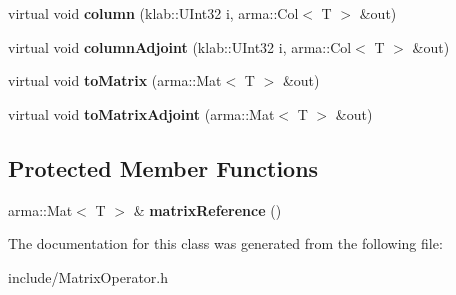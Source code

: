 \begin{DoxyCompactItemize}
\item 
virtual void {\bfseries column} (klab\+::\+U\+Int32 i, arma\+::\+Col$<$ T $>$ \&out)\hypertarget{classkl1p_1_1TMatrixOperator_aec50334a8ff1c438897a8f7abdf3b3b7}{}\label{classkl1p_1_1TMatrixOperator_aec50334a8ff1c438897a8f7abdf3b3b7}

\item 
virtual void {\bfseries column\+Adjoint} (klab\+::\+U\+Int32 i, arma\+::\+Col$<$ T $>$ \&out)\hypertarget{classkl1p_1_1TMatrixOperator_aea91e234240321e0bd04a9e97d3748b1}{}\label{classkl1p_1_1TMatrixOperator_aea91e234240321e0bd04a9e97d3748b1}

\item 
virtual void {\bfseries to\+Matrix} (arma\+::\+Mat$<$ T $>$ \&out)\hypertarget{classkl1p_1_1TMatrixOperator_af4b41d27d38c0388128e4f03f4c2edf1}{}\label{classkl1p_1_1TMatrixOperator_af4b41d27d38c0388128e4f03f4c2edf1}

\item 
virtual void {\bfseries to\+Matrix\+Adjoint} (arma\+::\+Mat$<$ T $>$ \&out)\hypertarget{classkl1p_1_1TMatrixOperator_a30962334fe3b39731d8b7fceb17443af}{}\label{classkl1p_1_1TMatrixOperator_a30962334fe3b39731d8b7fceb17443af}

\end{DoxyCompactItemize}
\subsection*{Protected Member Functions}
\begin{DoxyCompactItemize}
\item 
arma\+::\+Mat$<$ T $>$ \& {\bfseries matrix\+Reference} ()\hypertarget{classkl1p_1_1TMatrixOperator_a2898e0c14e8053529098669cf763c23d}{}\label{classkl1p_1_1TMatrixOperator_a2898e0c14e8053529098669cf763c23d}

\end{DoxyCompactItemize}


The documentation for this class was generated from the following file\+:\begin{DoxyCompactItemize}
\item 
include/Matrix\+Operator.\+h\end{DoxyCompactItemize}
